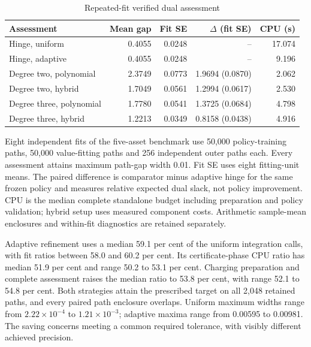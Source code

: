 \documentclass[11pt]{article}
\begin{document}
\begin{table}[!htbp]
\centering\small
\caption{Repeated-fit verified dual assessment}\label{tab:revision-replicated-refinement}
\begin{tabular}{@{}lrrrr@{}}
\toprule
Assessment & Mean gap & Fit SE & $\Delta$ (fit SE) & CPU (s) \\
\midrule
Hinge, uniform & 0.4055 & 0.0248 & -- & 17.074 \\
Hinge, adaptive & 0.4055 & 0.0248 & -- & 9.196 \\
Degree two, polynomial & 2.3749 & 0.0773 & 1.9694 (0.0870) & 2.062 \\
Degree two, hybrid & 1.7049 & 0.0561 & 1.2994 (0.0617) & 2.530 \\
Degree three, polynomial & 1.7780 & 0.0541 & 1.3725 (0.0684) & 4.798 \\
Degree three, hybrid & 1.2213 & 0.0349 & 0.8158 (0.0438) & 4.916 \\
\bottomrule
\end{tabular}
\par\smallskip\begin{minipage}{\textwidth}\footnotesize Eight independent fits of the five-asset benchmark use 50,000 policy-training paths, 50,000 value-fitting paths and 256 independent outer paths each. Every assessment attains maximum path-gap width 0.01. Fit SE uses eight fitting-unit means. The paired difference is comparator minus adaptive hinge for the same frozen policy and measures relative expected dual slack, not policy improvement. CPU is the median complete standalone budget including preparation and policy validation; hybrid setup uses measured component costs. Arithmetic sample-mean enclosures and within-fit diagnostics are retained separately.\end{minipage}
\end{table}

Adaptive refinement uses a median 59.1 per cent of the uniform integration calls, with fit ratios between 58.0 and 60.2 per cent. Its certificate-phase CPU ratio has median 51.9 per cent and range 50.2 to 53.1 per cent. Charging preparation and complete assessment raises the median ratio to 53.8 per cent, with range 52.1 to 54.8 per cent. Both strategies attain the prescribed target on all 2,048 retained paths, and every paired path enclosure overlaps. Uniform maximum widths range from $2.22\times10^{-4}$ to $1.21\times10^{-3}$; adaptive maxima range from 0.00595 to 0.00981. The saving concerns meeting a common required tolerance, with visibly different achieved precision.
\end{document}
